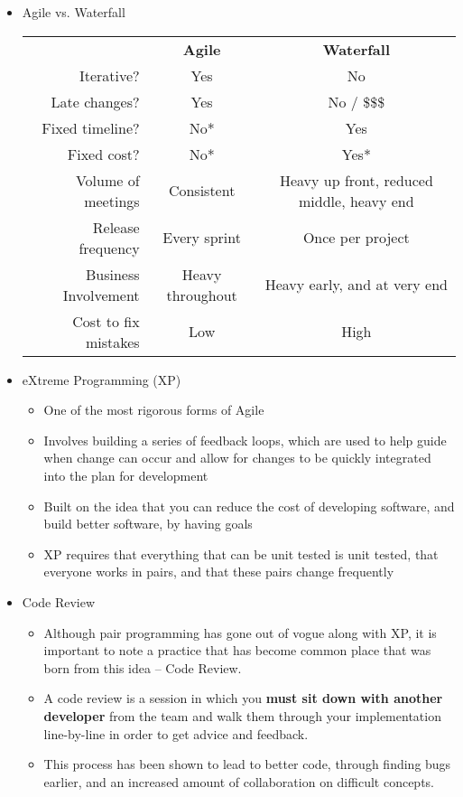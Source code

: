 \begin{itemize}
	\item Agile vs. Waterfall\\
	\begin{tabular}{| r c c |}
		\hline
		& \textbf{Agile} & \textbf{Waterfall}\\
		Iterative? & \cellcolor{green!25}Yes & \cellcolor{green!15}No\\
		Late changes? & \cellcolor{green!25}Yes & \cellcolor{green!15}No / \$\$\$\\
		Fixed timeline? & \cellcolor{green!15}No* & \cellcolor{green!25}Yes\\
		Fixed cost? & \cellcolor{green!15}No* & \cellcolor{green!25}Yes*\\
		Volume of meetings & \cellcolor{green!25}Consistent & Heavy up front, reduced middle, heavy end\\
		Release frequency & \cellcolor{green!25}Every sprint & \cellcolor{green!15}Once per project\\
		Business Involvement & Heavy throughout & Heavy early, and at very end\\
		Cost to fix mistakes & \cellcolor{green!25}Low & \cellcolor{green!15}High\\
		\hline
	\end{tabular}

	\item eXtreme Programming (XP)
	\begin{itemize}
		\item One of the most rigorous forms of Agile
		\item Involves building a series of feedback loops, which are used to help guide when change can occur and allow for changes to be quickly integrated into the plan for development
		\item Built on the idea that you can reduce the cost of developing software, and build better software, by having goals
		\item XP requires that everything that can be unit tested is unit tested, that everyone works in pairs, and that these pairs change frequently
	\end{itemize}

	\item Code Review
	\begin{itemize}
		\item Although pair programming has gone out of vogue along with XP, it is important to note a practice that has become common place that was born from this idea -- Code Review.
		\item A code review is a session in which you \textbf{must sit down with another developer} from the team and walk them through your implementation line-by-line in order to get advice and feedback.
		\item This process has been shown to lead to better code, through finding bugs earlier, and an increased amount of collaboration on difficult concepts.
	\end{itemize}


\end{itemize}
